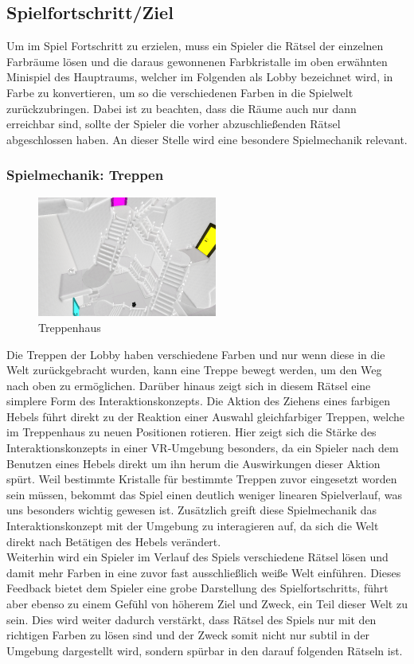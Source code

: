 \subsection{Spielfortschritt/Ziel}
Um im Spiel Fortschritt zu erzielen, muss ein Spieler die Rätsel der einzelnen Farbräume lösen und die daraus gewonnenen Farbkristalle im oben erwähnten Minispiel des Hauptraums, welcher im Folgenden als Lobby bezeichnet wird, in Farbe zu konvertieren, um so die verschiedenen Farben in die Spielwelt zurückzubringen.
Dabei ist zu beachten, dass die Räume auch nur dann erreichbar sind, sollte der Spieler die vorher abzuschließenden Rätsel abgeschlossen haben. An dieser Stelle wird eine besondere Spielmechanik relevant.
\subsubsection{Spielmechanik: Treppen}
\begin{figure}
	\vspace*{-0.5cm}
	\includegraphics[width=5.9cm]{Pictures/Treppenhaus}
	\caption{Treppenhaus}
	\vspace*{-0.5cm}
	\label{fig:treppenhaus}
\end{figure}
Die Treppen der Lobby haben verschiedene Farben und nur wenn diese in die Welt zurückgebracht wurden, kann eine Treppe bewegt werden, um den Weg nach oben zu ermöglichen. Darüber hinaus zeigt sich in diesem Rätsel eine simplere Form des Interaktionskonzepts. Die Aktion des Ziehens eines farbigen Hebels führt direkt zu der Reaktion einer Auswahl gleichfarbiger Treppen, welche im Treppenhaus zu neuen Positionen rotieren. Hier zeigt sich die Stärke des Interaktionskonzepts in einer VR-Umgebung besonders, da ein Spieler nach dem Benutzen eines Hebels direkt um ihn herum die Auswirkungen dieser Aktion spürt. Weil bestimmte Kristalle für bestimmte Treppen zuvor eingesetzt worden sein müssen, bekommt das Spiel einen deutlich weniger linearen Spielverlauf, was uns besonders wichtig gewesen ist. Zusätzlich greift diese Spielmechanik das Interaktionskonzept mit der Umgebung zu interagieren auf, da sich die Welt direkt nach Betätigen des Hebels verändert.\\
\noindent Weiterhin wird ein Spieler im Verlauf des Spiels verschiedene Rätsel lösen und damit mehr Farben in eine zuvor fast ausschließlich weiße Welt einführen. Dieses Feedback bietet dem Spieler eine grobe Darstellung des Spielfortschritts, führt aber ebenso zu einem Gefühl von höherem Ziel und Zweck, ein Teil dieser Welt zu sein. Dies wird weiter dadurch verstärkt, dass Rätsel des Spiels nur mit den richtigen Farben zu lösen sind und der Zweck somit nicht nur subtil in der Umgebung dargestellt wird, sondern spürbar in den darauf folgenden Rätseln ist.\newpage \noindent
